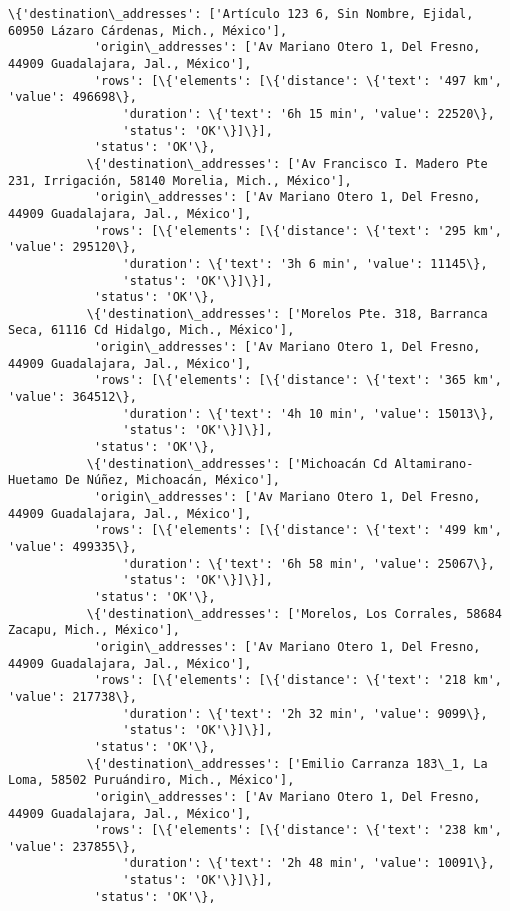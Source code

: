 \documentclass[11pt]{article}
\begin{document}
\begin{Verbatim}[commandchars=\\\{\}]
           \{'destination\_addresses': ['Artículo 123 6, Sin Nombre, Ejidal, 60950 Lázaro Cárdenas, Mich., México'],
            'origin\_addresses': ['Av Mariano Otero 1, Del Fresno, 44909 Guadalajara, Jal., México'],
            'rows': [\{'elements': [\{'distance': \{'text': '497 km', 'value': 496698\},
                'duration': \{'text': '6h 15 min', 'value': 22520\},
                'status': 'OK'\}]\}],
            'status': 'OK'\},
           \{'destination\_addresses': ['Av Francisco I. Madero Pte 231, Irrigación, 58140 Morelia, Mich., México'],
            'origin\_addresses': ['Av Mariano Otero 1, Del Fresno, 44909 Guadalajara, Jal., México'],
            'rows': [\{'elements': [\{'distance': \{'text': '295 km', 'value': 295120\},
                'duration': \{'text': '3h 6 min', 'value': 11145\},
                'status': 'OK'\}]\}],
            'status': 'OK'\},
           \{'destination\_addresses': ['Morelos Pte. 318, Barranca Seca, 61116 Cd Hidalgo, Mich., México'],
            'origin\_addresses': ['Av Mariano Otero 1, Del Fresno, 44909 Guadalajara, Jal., México'],
            'rows': [\{'elements': [\{'distance': \{'text': '365 km', 'value': 364512\},
                'duration': \{'text': '4h 10 min', 'value': 15013\},
                'status': 'OK'\}]\}],
            'status': 'OK'\},
           \{'destination\_addresses': ['Michoacán Cd Altamirano-Huetamo De Núñez, Michoacán, México'],
            'origin\_addresses': ['Av Mariano Otero 1, Del Fresno, 44909 Guadalajara, Jal., México'],
            'rows': [\{'elements': [\{'distance': \{'text': '499 km', 'value': 499335\},
                'duration': \{'text': '6h 58 min', 'value': 25067\},
                'status': 'OK'\}]\}],
            'status': 'OK'\},
           \{'destination\_addresses': ['Morelos, Los Corrales, 58684 Zacapu, Mich., México'],
            'origin\_addresses': ['Av Mariano Otero 1, Del Fresno, 44909 Guadalajara, Jal., México'],
            'rows': [\{'elements': [\{'distance': \{'text': '218 km', 'value': 217738\},
                'duration': \{'text': '2h 32 min', 'value': 9099\},
                'status': 'OK'\}]\}],
            'status': 'OK'\},
           \{'destination\_addresses': ['Emilio Carranza 183\_1, La Loma, 58502 Puruándiro, Mich., México'],
            'origin\_addresses': ['Av Mariano Otero 1, Del Fresno, 44909 Guadalajara, Jal., México'],
            'rows': [\{'elements': [\{'distance': \{'text': '238 km', 'value': 237855\},
                'duration': \{'text': '2h 48 min', 'value': 10091\},
                'status': 'OK'\}]\}],
            'status': 'OK'\},

\end{Verbatim}
\end{document}
